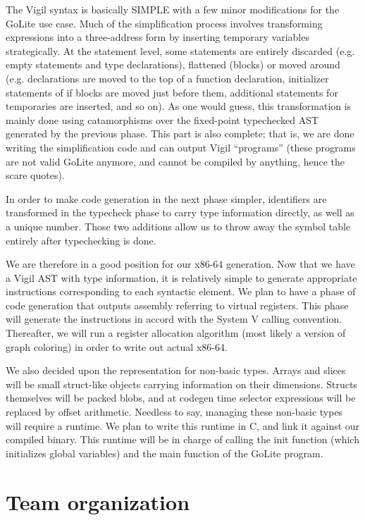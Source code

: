 \documentclass[letterpaper,11pt]{article}
\begin{document}
The Vigil syntax is basically SIMPLE with a few minor modifications for the GoLite use case. Much of the simplification process involves transforming expressions into a three-address form by inserting temporary variables strategically. At the statement level, some statements are entirely discarded (e.g. empty statements and type declarations), flattened (blocks) or moved around (e.g. declarations are moved to the top of a function declaration, initializer statements of if blocks are moved just before them, additional statements for temporaries are inserted, and so on). As one would guess, this transformation is mainly done using catamorphisms over the fixed-point typechecked AST generated by the previous phase. This part is also complete; that is, we are done writing the simplification code and can output Vigil ``programs'' (these programs are not valid GoLite anymore, and cannot be compiled by anything, hence the scare quotes).

In order to make code generation in the next phase simpler, identifiers are transformed in the typecheck phase to carry type information directly, as well as a unique number. Those two additions allow us to throw away the symbol table entirely after typechecking is done.

We are therefore in a good position for our x86-64 generation. Now that we have a Vigil AST with type information, it is relatively simple to generate appropriate instructions corresponding to each syntactic element. We plan to have a phase of code generation that outputs assembly referring to virtual registers. This phase will generate the instructions in accord with the System V calling convention. Thereafter, we will run a register allocation algorithm (most likely a version of graph coloring) in order to write out actual x86-64.

We also decided upon the representation for non-basic types. Arrays and slices will be small struct-like objects carrying information on their dimensions. Structs themselves will be packed blobs, and at codegen time selector expressions will be replaced by offset arithmetic. Needless to say, managing these non-basic types will require a runtime. We plan to write this runtime in C, and link it against our compiled binary. This runtime will be in charge of calling the init function (which initializes global variables) and the main function of the GoLite program.

\section{Team organization}
\end{document}
